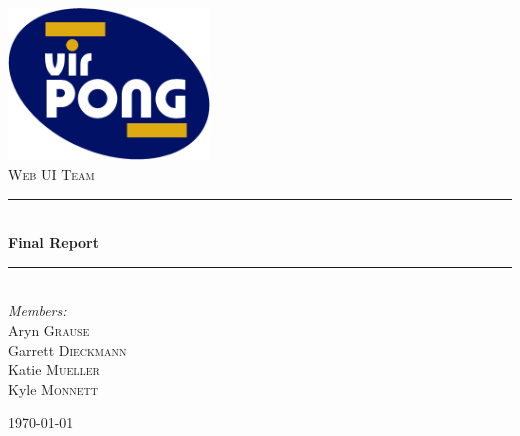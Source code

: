 %

\newcommand{\HRule}{\rule{\linewidth}{0.5mm}}

\begin{titlepage}
	\begin{center}

		\includegraphics[width=0.40\textwidth]{./logo.png}\\[1cm]

		\textsc{\large Web UI Team}\\[1.5cm]

		\HRule \\[0.4cm]
			{\huge \bfseries Final Report}\\[0.4cm]
		\HRule \\[1.5cm]

		\emph{Members:}\\
		Aryn \textsc{Grause}\\
		Garrett \textsc{Dieckmann}\\
		Katie \textsc{Mueller}\\
		Kyle \textsc{Monnett}\\
		
		\vfill

		{\large \today}
		
	\end{center}
\end{titlepage}